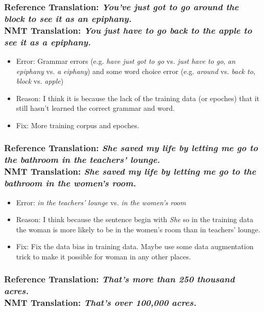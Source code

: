 \documentclass[12pt, letterpaper]{article}
\begin{document}
\subsubsection{\textbf{Reference Translation}: \textit{You’ve just got to go around the block to see it as an epiphany.} \\ \textbf{NMT Translation}: \textit{You just have to go back to the apple to see it as a epiphany.}}

\begin{itemize}
  \item Error: Grammar errors (e.g. \textit{have just got to go} vs. \textit{just have to go}, \textit{an epiphany} vs. \textit{a eiphany}) and some word choice error (e.g. \textit{around} vs. \textit{back to}, \textit{block} vs. \textit{apple})
  \item Reason: I think it is because the lack of the training data (or epoches) that it still hasn't learned the correct grammar and word.
  \item Fix: More training corpus and epoches.
\end{itemize}

\subsubsection{\textbf{Reference Translation}: \textit{She saved my life by letting me go to the bathroom in the teachers’ lounge.} \\ \textbf{NMT Translation}: \textit{She saved my life by letting me go to the bathroom in the women’s room.}}

\begin{itemize}
  \item Error: \textit{in the teachers’ lounge} vs. \textit{in the women’s room}
  \item Reason: I think because the sentence begin with \textit{She} so in the training data the woman is more likely to be in the women's room than in teachers' lounge.
  \item Fix: Fix the data bias in training data. Maybe use some data augmentation trick to make it possible for woman in any other places.
\end{itemize}

\subsubsection{\textbf{Reference Translation}: \textit{That’s more than 250 thousand acres.} \\ \textbf{NMT Translation}: \textit{That’s over 100,000 acres.}}
\end{document}
